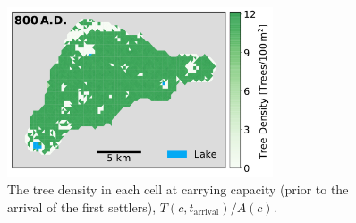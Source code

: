 \begin{figure}
	\centering
	\includegraphics[width=0.7\textwidth]{images/map_carrCap.pdf}
	\caption{The tree density in each cell at carrying capacity (prior to the arrival of the first settlers), $T(c,t_\text{arrival})/A(c)$.}
	\label{fig:Map_tree}
\end{figure}

